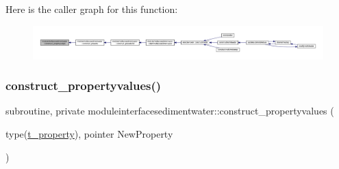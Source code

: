 Here is the caller graph for this function\+:\nopagebreak
\begin{figure}[H]
\begin{center}
\leavevmode
\includegraphics[width=350pt]{namespacemoduleinterfacesedimentwater_a63417d4ba89dc1cc869efface42ddc8a_icgraph}
\end{center}
\end{figure}
\mbox{\label{namespacemoduleinterfacesedimentwater_a9e41247ffadd3cbbaf6315c7a890f885}} 
\subsubsection{\texorpdfstring{construct\+\_\+propertyvalues()}{construct\_propertyvalues()}}
{\footnotesize\ttfamily subroutine, private moduleinterfacesedimentwater\+::construct\+\_\+propertyvalues (\begin{DoxyParamCaption}\item[{type(\mbox{\hyperlink{structmoduleinterfacesedimentwater_1_1t__property}{t\+\_\+property}}), pointer}]{New\+Property }\end{DoxyParamCaption})\hspace{0.3cm}{\ttfamily [private]}}

